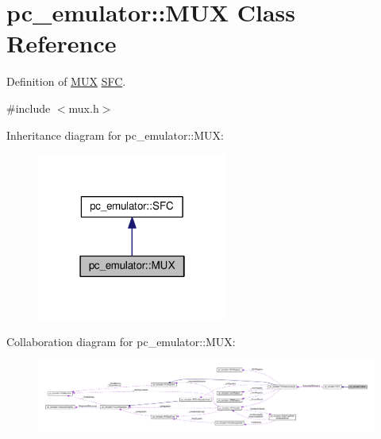 \hypertarget{classpc__emulator_1_1MUX}{}\section{pc\+\_\+emulator\+:\+:M\+UX Class Reference}
\label{classpc__emulator_1_1MUX}


Definition of \hyperlink{classpc__emulator_1_1MUX}{M\+UX} \hyperlink{classpc__emulator_1_1SFC}{S\+FC}.  




{\ttfamily \#include $<$mux.\+h$>$}



Inheritance diagram for pc\+\_\+emulator\+:\+:M\+UX\+:
\nopagebreak
\begin{figure}[H]
\begin{center}
\leavevmode
\includegraphics[width=178pt]{classpc__emulator_1_1MUX__inherit__graph}
\end{center}
\end{figure}


Collaboration diagram for pc\+\_\+emulator\+:\+:M\+UX\+:
\nopagebreak
\begin{figure}[H]
\begin{center}
\leavevmode
\includegraphics[width=350pt]{classpc__emulator_1_1MUX__coll__graph}
\end{center}
\end{figure}

